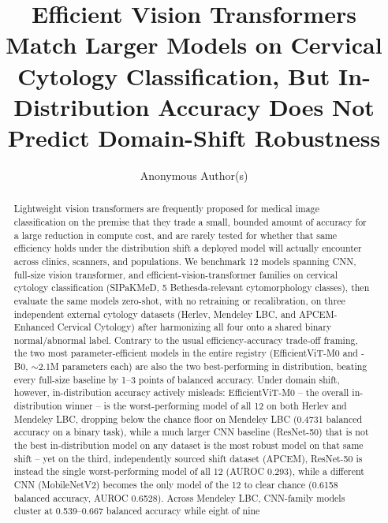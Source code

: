 \documentclass[runningheads]{llncs}
\begin{document}
\title{Efficient Vision Transformers Match Larger Models on Cervical Cytology Classification, But In-Distribution Accuracy Does Not Predict Domain-Shift Robustness}

\author{Anonymous Author(s)}

\maketitle

\begin{abstract}
Lightweight vision transformers are frequently proposed for medical image
classification on the premise that they trade a small, bounded amount of
accuracy for a large reduction in compute cost, and are rarely tested for
whether that same efficiency holds under the distribution shift a deployed
model will actually encounter across clinics, scanners, and populations.
We benchmark 12 models spanning CNN, full-size vision transformer, and
efficient-vision-transformer families on cervical cytology classification
(SIPaKMeD, 5 Bethesda-relevant cytomorphology classes), then evaluate the
same models zero-shot, with no retraining or recalibration, on three
independent external cytology datasets (Herlev, Mendeley LBC, and
APCEM-Enhanced Cervical Cytology) after harmonizing all four onto a shared
binary normal/abnormal label. Contrary to the usual efficiency-accuracy
trade-off framing, the two most parameter-efficient models in the entire
registry (EfficientViT-M0 and -B0, $\sim$2.1M parameters each) are also the
two best-performing in distribution, beating every full-size baseline by
1--3 points of balanced accuracy. Under domain shift, however,
in-distribution accuracy actively misleads: EfficientViT-M0 -- the overall
in-distribution winner -- is the worst-performing model of all 12 on both
Herlev and Mendeley LBC, dropping below the chance floor on Mendeley LBC
(0.4731 balanced accuracy on a binary task), while a much larger CNN
baseline (ResNet-50) that is not the best in-distribution model on any
dataset is the most robust model on that same shift -- yet on the third,
independently sourced shift dataset (APCEM), ResNet-50 is instead the
single worst-performing model of all 12 (AUROC 0.293), while a different
CNN (MobileNetV2) becomes the only model of the 12 to clear chance
(0.6158 balanced accuracy, AUROC 0.6528). Across Mendeley LBC, CNN-family
models cluster at 0.539--0.667 balanced accuracy while eight of nine

\end{abstract}
\end{document}
